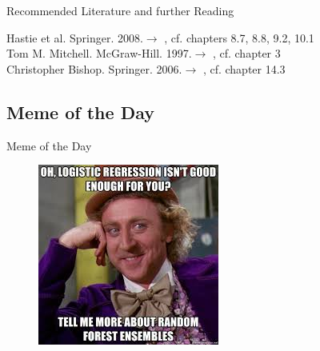\begin{frame}[allowframebreaks]{Recommended Literature and further Reading}{}
	\footnotesize
	\begin{thebibliography}{2}
			{Hastie et al. Springer. 2008.}{$\rightarrow$ \href{
				https://web.stanford.edu/~hastie/Papers/ESLII.pdf
			}{}, cf. chapters 8.7, 8.8, 9.2, 10.1}\\
			{Tom M. Mitchell. McGraw-Hill. 1997.}{$\rightarrow$ \href{
				https://www.cs.ubbcluj.ro/~gabis/ml/ml-books/McGrawHill\%20-\%20Machine\%20Learning\%20-Tom\%20Mitchell.pdf
			}{}, cf. chapter 3}\\
			{Christopher Bishop. Springer. 2006.}{$\rightarrow$ \href{
				http://users.isr.ist.utl.pt/~wurmd/Livros/school/Bishop\%20-\%20Pattern\%20Recognition\%20And\%20Machine\%20Learning\%20-\%20Springer\%20\%202006.pdf
			}{}, cf. chapter 14.3}
	\end{thebibliography}
\end{frame}


\subsection{Meme of the Day}

\begin{frame}{Meme of the Day}{}
	\begin{figure}
		\includegraphics[scale=0.65]{08_decision_trees/02_img/meme_of_the_day}
	\end{figure}
\end{frame}


\makethanks

